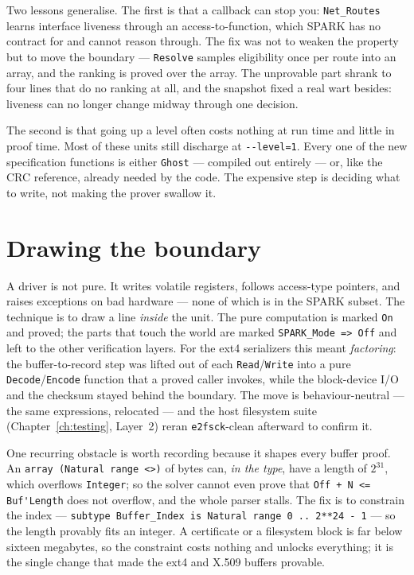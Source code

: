 Two lessons generalise. The first is that a callback can stop you: \lstinline{Net_Routes}
learns interface liveness through an access-to-function, which SPARK has no contract for
and cannot reason through. The fix was not to weaken the property but to move the
boundary --- \lstinline{Resolve} samples eligibility once per route into an array, and
the ranking is proved over the array. The unprovable part shrank to four lines that do
no ranking at all, and the snapshot fixed a real wart besides: liveness can no longer
change midway through one decision.

The second is that going up a level often costs nothing at run time and little in proof
time. Most of these units still discharge at \lstinline{--level=1}. Every one of the new
specification functions is either \lstinline{Ghost} --- compiled out entirely --- or,
like the CRC reference, already needed by the code. The expensive step is deciding what
to write, not making the prover swallow it.

\section{Drawing the boundary}

A driver is not pure. It writes volatile registers, follows access-type pointers, and
raises exceptions on bad hardware --- none of which is in the SPARK subset. The
technique is to draw a line \emph{inside} the unit. The pure computation is marked
\lstinline{On} and proved; the parts that touch the world are marked
\lstinline{SPARK_Mode => Off} and left to the other verification layers. For the ext4
serializers this meant \emph{factoring}: the buffer-to-record step was lifted out of
each \lstinline{Read}/\lstinline{Write} into a pure \lstinline{Decode}/\lstinline{Encode}
function that a proved caller invokes, while the block-device I/O and the checksum
stayed behind the boundary. The move is behaviour-neutral --- the same expressions,
relocated --- and the host filesystem suite (Chapter~\ref{ch:testing}, Layer~2) reran
\texttt{e2fsck}-clean afterward to confirm it.

One recurring obstacle is worth recording because it shapes every buffer proof. An
\lstinline{array (Natural range <>)} of bytes can, \emph{in the type}, have a length
of $2^{31}$, which overflows \lstinline{Integer}; so the solver cannot even prove that
\lstinline{Off + N <= Buf'Length} does not overflow, and the whole parser stalls. The
fix is to constrain the index --- \lstinline{subtype Buffer_Index is Natural range 0 .. 2**24 - 1}
--- so the length provably fits an integer. A certificate or a filesystem block is far
below sixteen megabytes, so the constraint costs nothing and unlocks everything; it is
the single change that made the ext4 and X.509 buffers provable.

